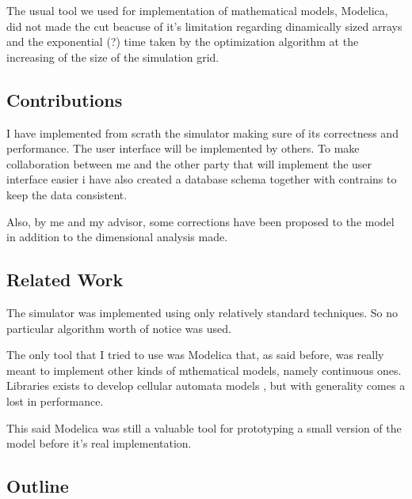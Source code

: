 \documentclass[draft]{article}
\begin{document}
The usual tool we used for implementation of mathematical models, Modelica, did
not made the cut beacuse of it's limitation regarding dinamically sized arrays
and the exponential (?) time taken by the optimization algorithm at the
increasing of the size of the simulation grid.

\subsection{Contributions}\label{sec:contrib}

I have implemented from scrath the simulator making sure of its correctness and
performance. The user interface will be implemented by others. To make
collaboration between me and the other party that will implement the user
interface easier i have also created a database schema together with contrains
to keep the data consistent.

Also, by me and my advisor, some corrections have been proposed to the model in
addition to the dimensional analysis made.

\subsection{Related Work}\label{sec:related_work}

The simulator was implemented using only relatively standard techniques. So no
particular algorithm worth of notice was used.

The only tool that I tried to use was Modelica that, as said before, was really
meant to implement other kinds of mthematical models, namely continuous ones.
Libraries exists to develop cellular automata models \cite{calib2}, but with
generality comes a lost in performance.

This said Modelica was still a valuable tool for prototyping a small version of
the model before it's real implementation.


\subsection{Outline}\label{sec:outline}
\end{document}
